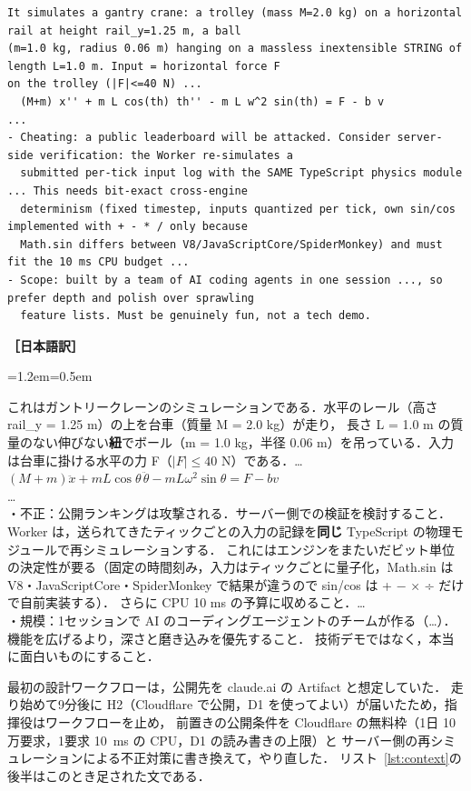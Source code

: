 \documentclass[a4paper,10pt]{ltjsarticle}
\newcommand{\lstref}[1]{リスト~\ref{#1}}
\newenvironment{yaku}{\par\vspace{-2pt}\small\noindent\textbf{［日本語訳］}\par\nopagebreak\begin{list}{}{\leftmargin=1.2em\rightmargin=0.5em\topsep=1pt}\item\relax}{\end{list}\vspace{4pt}}
\begin{document}
\begin{lstlisting}[caption={全エージェント共通の前置き（抜粋）},label={lst:context}]
It simulates a gantry crane: a trolley (mass M=2.0 kg) on a horizontal rail at height rail_y=1.25 m, a ball
(m=1.0 kg, radius 0.06 m) hanging on a massless inextensible STRING of length L=1.0 m. Input = horizontal force F
on the trolley (|F|<=40 N) ...
  (M+m) x'' + m L cos(th) th'' - m L w^2 sin(th) = F - b v
...
- Cheating: a public leaderboard will be attacked. Consider server-side verification: the Worker re-simulates a
  submitted per-tick input log with the SAME TypeScript physics module ... This needs bit-exact cross-engine
  determinism (fixed timestep, inputs quantized per tick, own sin/cos implemented with + - * / only because
  Math.sin differs between V8/JavaScriptCore/SpiderMonkey) and must fit the 10 ms CPU budget ...
- Scope: built by a team of AI coding agents in one session ..., so prefer depth and polish over sprawling
  feature lists. Must be genuinely fun, not a tech demo.
\end{lstlisting}
\begin{yaku}
これはガントリークレーンのシミュレーションである．水平のレール（高さ rail\_y = 1.25 m）の上を台車（質量 M = 2.0 kg）が走り，
長さ L = 1.0 m の質量のない伸びない\textbf{紐}でボール（m = 1.0 kg，半径 0.06 m）を吊っている．入力は台車に掛ける水平の力 F（$|F| \le 40$ N）である．…\\
$(M+m)\ddot{x} + mL\cos\theta\,\ddot{\theta} - mL\omega^2\sin\theta = F - bv$\\
…\\
・不正：公開ランキングは攻撃される．サーバー側での検証を検討すること．Worker は，送られてきたティックごとの入力の記録を\textbf{同じ} TypeScript の物理モジュールで再シミュレーションする．
これにはエンジンをまたいだビット単位の決定性が要る（固定の時間刻み，入力はティックごとに量子化，Math.sin は V8・JavaScriptCore・SpiderMonkey で結果が違うので sin/cos は + − × ÷ だけで自前実装する）．
さらに CPU 10 ms の予算に収めること．…\\
・規模：1セッションで AI のコーディングエージェントのチームが作る（…）．機能を広げるより，深さと磨き込みを優先すること．
技術デモではなく，本当に面白いものにすること．
\end{yaku}

最初の設計ワークフローは，公開先を claude.ai の Artifact と想定していた．
走り始めて9分後に H2（Cloudflare で公開，D1 を使ってよい）が届いたため，指揮役はワークフローを止め，
前置きの公開条件を Cloudflare の無料枠（1日 10 万要求，1要求 \SI{10}{ms} の CPU，D1 の読み書きの上限）と
サーバー側の再シミュレーションによる不正対策に書き換えて，やり直した．
\lstref{lst:context}の後半はこのとき足された文である．
\end{document}
